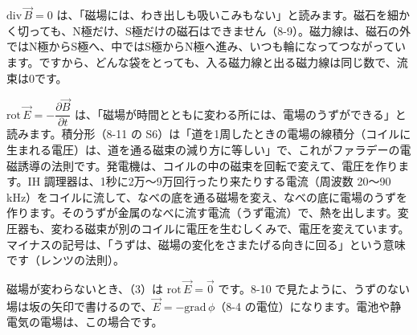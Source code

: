 $\mathrm{div}\,\vec B=0$ は、「磁場には、わき出しも吸いこみもない」と読みます。磁石を細かく切っても、N極だけ、S極だけの磁石はできません（8-9）。磁力線は、磁石の外ではN極からS極へ、中ではS極からN極へ進み、いつも輪になってつながっています。ですから、どんな袋をとっても、入る磁力線と出る磁力線は同じ数で、流束は0です。

\begin{bkfigure}
\label{bk:8-14:fig-yottsu}
\end{bkfigure}

$\mathrm{rot}\,\vec E=-\dfrac{\partial\vec B}{\partial t}$ は、「磁場が時間とともに変わる所には、電場のうずができる」と読みます。積分形（8-11 の S6）は「道を1周したときの電場の線積分（コイルに生まれる電圧）は、道を通る磁束の減り方に等しい」で、これがファラデーの電磁誘導の法則です。発電機は、コイルの中の磁束を回転で変えて、電圧を作ります。IH 調理器は、1秒に2万〜9万回行ったり来たりする電流（周波数 20〜90 kHz）をコイルに流して、なべの底を通る磁場を変え、なべの底に電場のうずを作ります。そのうずが金属のなべに流す電流（うず電流）で、熱を出します。変圧器も、変わる磁束が別のコイルに電圧を生むしくみで、電圧を変えています。マイナスの記号は、「うずは、磁場の変化をさまたげる向きに回る」という意味です（レンツの法則）。

磁場が変わらないとき、（3）は $\mathrm{rot}\,\vec E=\vec0$ です。8-10 で見たように、うずのない場は坂の矢印で書けるので、$\vec E=-\mathrm{grad}\,\phi$（8-4 の電位）になります。電池や静電気の電場は、この場合です。

